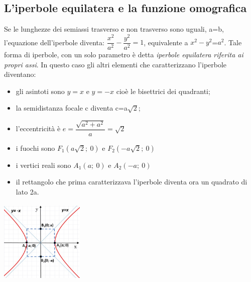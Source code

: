 \subsection{L'iperbole equilatera e la funzione omografica}
\label{subsec:iperbole_omografica}

Se le lunghezze dei semiassi trasverso e non trasverso sono uguali, a=b, 
l'equazione dell'iperbole diventa: 
$ \dfrac{x^{2}}{a^{2}}-\dfrac{y^{2}}{a^{2}}=1$,   equivalente a   $ 
x^{2}-y^{2} $=$ a^{2} $. 
Tale forma di iperbole, con un solo parametro è detta 
\emph{iperbole equilatera riferita ai propri assi}. 
In questo caso gli altri elementi che caratterizzano l'iperbole diventano:

\vspace{12pt}
  \noindent\begin{minipage}[c]{.65\textwidth}
  \begin{itemize} [noitemsep]
    \item gli asintoti sono $y=x$ e $y=-x$ cioè le bisettrici dei quadranti;
    \item la semidistanza focale c diventa c=a$ \sqrt{2} $;
    \item l'eccentricità è $e = \dfrac{\sqrt{a^{2}+a^{2}}}{a}=\sqrt{2} $
    \item i fuochi sono $ F_{1} \left(a \sqrt{2};~0\right)$ e 
                        $ F_{2}\left(-a \sqrt{2};~0\right)$
    \item i vertici reali sono $ A_{1}(a;~0)$ e $A_{2}(-a;~0)$  
    \item il rettangolo che prima caratterizzava l'iperbole diventa ora 
          un quadrato di lato 2a. 
  \end{itemize}    
  \end{minipage}
  \hfill
  \begin{minipage}[c]{.3\textwidth}
    \includegraphics[height=4cm, width=4cm,]{img/equilatera.jpg}
  \end{minipage}

